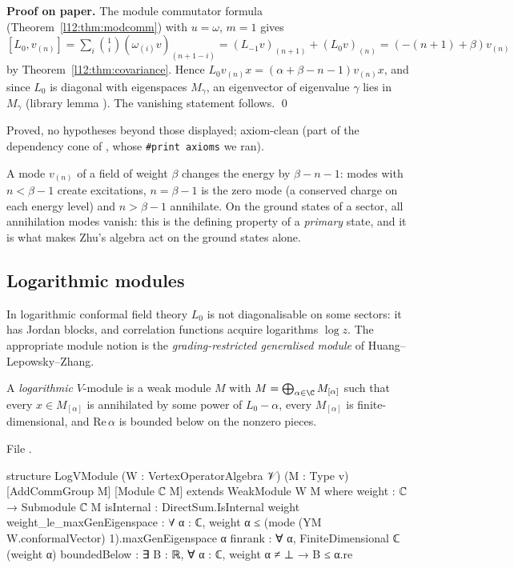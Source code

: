\textbf{Proof on paper.} The module commutator formula (Theorem~\ref{l12:thm:modcomm}) with $u=\omega$,
$m = 1$ gives $[L_0,v_{(n)}] = \sum_i\binom1i(\omega_{(i)}v)_{(n+1-i)} = (L_{-1}v)_{(n+1)} + (L_0v)_{(n)}
= (-(n+1)+\beta)v_{(n)}$ by Theorem~\ref{l12:thm:covariance}. Hence $L_0v_{(n)}x = (\alpha+\beta-n-1)v_{(n)}x$,
and since $L_0$ is diagonal with eigenspaces $M_\gamma$, an eigenvector of eigenvalue $\gamma$ lies in
$M_\gamma$ (library lemma ). The vanishing statement follows. \qed

\begin{status}
Proved, no hypotheses beyond those displayed; axiom-clean (part of the dependency cone of
, whose \texttt{\#print axioms} we ran).
\end{status}

\begin{physics}
A mode $v_{(n)}$ of a field of weight $\beta$ changes the energy by $\beta-n-1$: modes with $n<\beta-1$ create
excitations, $n=\beta-1$ is the zero mode (a conserved charge on each energy level) and $n>\beta-1$ annihilate. On
the ground states of a sector, all annihilation modes vanish: this is the defining property of a \emph{primary}
state, and it is what makes Zhu's algebra act on the ground states alone.
\end{physics}

\subsection{Logarithmic modules}

In logarithmic conformal field theory $L_0$ is not diagonalisable on some sectors: it has Jordan
blocks, and correlation functions acquire logarithms $\log z$. The appropriate module notion is the
\emph{grading-restricted generalised module} of Huang--Lepowsky--Zhang.

\begin{definition}\label{l12:def:log}
A \emph{logarithmic} $V$-module is a weak module $M$ with $M = \bigoplus_{\alpha\in\C}M_{[\alpha]}$ such
that every $x\in M_{[\alpha]}$ is annihilated by some power of $L_0-\alpha$, every $M_{[\alpha]}$ is
finite-dimensional, and $\mathrm{Re}\,\alpha$ is bounded below on the nonzero pieces.
\end{definition}
\noindent File .
\begin{leancode}
structure LogVModule (W : VertexOperatorAlgebra 𝒱) (M : Type v)
    [AddCommGroup M] [Module ℂ M] extends WeakModule W M where
  weight : ℂ → Submodule ℂ M
  isInternal : DirectSum.IsInternal weight
  weight_le_maxGenEigenspace :
    ∀ α : ℂ, weight α ≤ (mode (YM W.conformalVector) 1).maxGenEigenspace α
  finrank : ∀ α, FiniteDimensional ℂ (weight α)
  boundedBelow : ∃ B : ℝ, ∀ α : ℂ, weight α ≠ ⊥ → B ≤ α.re
\end{leancode}

